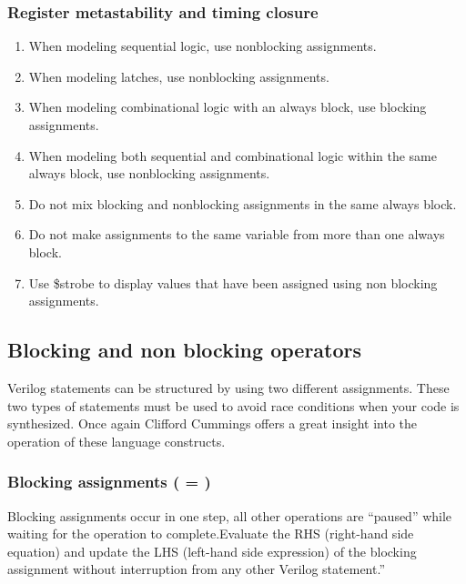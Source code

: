     \subsubsection{Register metastability and timing closure}
    
    \begin{enumerate}
      \item When modeling sequential logic, use nonblocking assignments.
      \item When modeling latches, use nonblocking assignments.
      \item When modeling combinational logic with an always block, use blocking assignments.
      \item When modeling both sequential and combinational logic within the same always block, use nonblocking assignments.
      \item Do not mix blocking and nonblocking assignments in the same always block.
      \item Do not make assignments to the same variable from more than one always block.
      \item Use \$strobe to display values that have been assigned using non blocking assignments.
    \end{enumerate}

  \subsection{Blocking and non blocking operators}
    Verilog statements can be structured by using two different assignments. These two types of statements must be used to avoid race conditions when your code is synthesized. Once again Clifford Cummings offers a great insight into the operation of these language constructs. 
      
    \subsubsection{Blocking assignments \bfseries ( = )} 
      Blocking assignments occur in one step, all other operations are ``paused'' while waiting for the operation to complete.Evaluate the RHS (right-hand side equation) and update the LHS (left-hand side expression) of the blocking assignment without interruption from any other Verilog statement.''\cite{Sunburst:BlockNoBlock}

